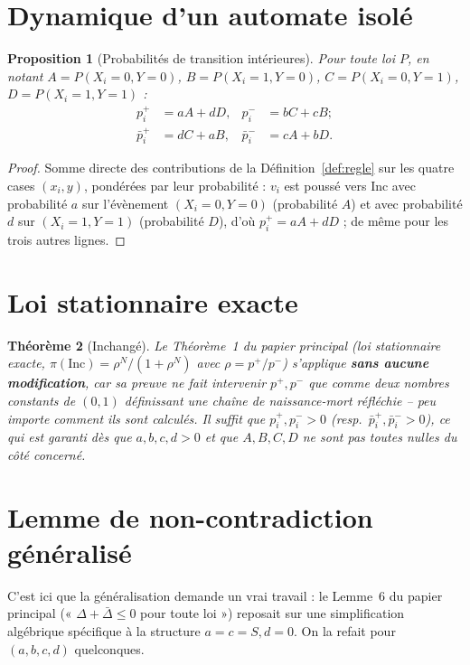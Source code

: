 \documentclass[12pt,a4paper]{article}
\newtheorem{theorem}{Théorème}[section]
\newtheorem{proposition}[theorem]{Proposition}
\theoremstyle{remark}
\newcommand{\Inc}{\ensuremath{\mathrm{Inc}}}
\begin{document}
\section{Dynamique d'un automate isolé}

\begin{proposition}[Probabilités de transition intérieures]\label{prop:pv}
Pour toute loi $P$, en notant $A=P(X_i{=}0,Y{=}0)$, $B=P(X_i{=}1,Y{=}0)$,
$C=P(X_i{=}0,Y{=}1)$, $D=P(X_i{=}1,Y{=}1)$ :
\begin{align*}
  p_i^+ &= aA+dD, & p_i^- &= bC+cB; \\
  \bar p_i^+ &= dC+aB, & \bar p_i^- &= cA+bD.
\end{align*}
\end{proposition}

\begin{proof}
Somme directe des contributions de la Définition~\ref{def:regle} sur les
quatre cases $(x_i,y)$, pondérées par leur probabilité : $v_i$ est poussé
vers $\Inc$ avec probabilité $a$ sur l'évènement $(X_i{=}0,Y{=}0)$ (probabilité
$A$) et avec probabilité $d$ sur $(X_i{=}1,Y{=}1)$ (probabilité $D$), d'où
$p_i^+=aA+dD$ ; de même pour les trois autres lignes.
\end{proof}



\section{Loi stationnaire exacte}

\begin{theorem}[Inchangé]\label{thm:stat-gen}
Le Théorème~1 du papier principal (loi stationnaire exacte, $\pi(\Inc)=\rho^N/(1+\rho^N)$
avec $\rho=p^+/p^-$) s'applique \textbf{sans aucune modification}, car sa
preuve ne fait intervenir $p^+,p^-$ que comme deux nombres constants de
$(0,1)$ définissant une chaîne de naissance-mort réfléchie -- peu importe
comment ils sont calculés. Il suffit que $p_i^+,p_i^->0$ (resp.\
$\bar p_i^+,\bar p_i^->0$), ce qui est garanti dès que $a,b,c,d>0$ et que $A,B,C,D$
ne sont pas toutes nulles du côté concerné.
\end{theorem}

\section{Lemme de non-contradiction généralisé}

C'est ici que la généralisation demande un vrai travail : le Lemme~6 du
papier principal (« $\Delta+\bar\Delta\le0$ pour toute loi ») reposait sur une
simplification algébrique spécifique à la structure $a=c=S,d=0$. On la
refait pour $(a,b,c,d)$ quelconques.
\end{document}
